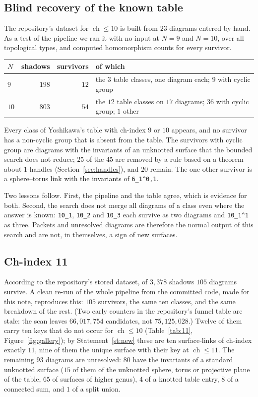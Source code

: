 \documentclass[11pt]{amsart}
\newcommand{\ch}{\operatorname{ch}}
\newcommand{\lab}[1]{\texttt{#1}}
\theoremstyle{plain}
\theoremstyle{remark}
\begin{document}
\subsection{Blind recovery of the known table}\label{sec:blind}

The repository's dataset for $\ch\le 10$ is built from $23$ diagrams entered by hand. As a test of the
pipeline we ran it with no input at $N=9$ and $N=10$, over all topological types, and computed
homomorphism counts for every survivor.

\begin{center}
\begin{tabular}{@{}lrrl@{}}
\toprule
$N$ & shadows & survivors & of which \\
\midrule
$9$ & $198$ & $12$ & the $3$ table classes, one diagram each; $9$ with cyclic group \\
$10$ & $803$ & $54$ & the $12$ table classes on $17$ diagrams; $36$ with cyclic group; $1$ other \\
\bottomrule
\end{tabular}
\end{center}

Every class of Yoshikawa's table with ch-index $9$ or $10$ appears, and no survivor has a non-cyclic
group that is absent from the table. The survivors with cyclic group are diagrams with the invariants of
an unknotted surface that the bounded search does not reduce; $25$ of the $45$ are removed by a rule based
on a theorem about $1$-handles (Section~\ref{sec:handles}), and $20$ remain. The one other survivor is a
sphere--torus link with the invariants of \lab{6\_1\^{}0,1}.

Two lessons follow. First, the pipeline and the table agree, which is evidence for both. Second, the
search does not merge all diagrams of a class even where the answer is known: \lab{10\_1}, \lab{10\_2}
and \lab{10\_3} each survive as two diagrams and \lab{10\_1\^{}1} as three. Packets and unresolved
diagrams are therefore the normal output of this search and are not, in themselves, a sign of new
surfaces.

\subsection{Ch-index 11}\label{sec:eleven}

According to the repository's stored dataset, of $3{,}378$ shadows $105$ diagrams survive.
A clean re-run of the whole pipeline from the committed code, made for this note, reproduces this: $105$ survivors, the same ten classes, and the same breakdown of the rest. (Two early counters in the repository's funnel table are stale: the scan leaves $66{,}017{,}754$ candidates, not $75{,}125{,}028$.)
Twelve of them carry ten keys that do not occur for $\ch\le 10$ (Table~\ref{tab:11},
Figure~\ref{fig:gallery}); by Statement~\ref{st:new} these are ten surface-links of ch-index exactly $11$,
nine of them the unique surface with their key at $\ch\le 11$. The remaining $93$ diagrams are
unresolved: $80$ have the invariants of a standard unknotted surface ($15$ of them of the unknotted
sphere, torus or projective plane of the table, $65$ of surfaces of higher genus), $4$ of a knotted table
entry, $8$ of a connected sum, and $1$ of a split union.
\end{document}

